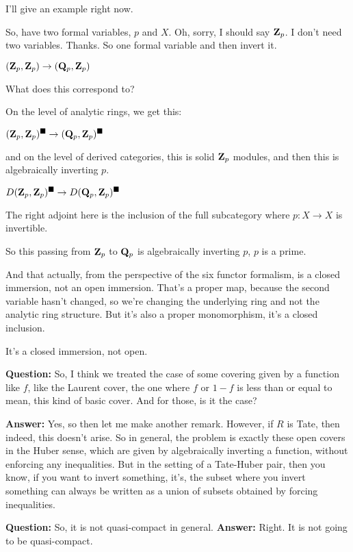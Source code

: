\begin{example}
I'll give an example right now.

So, have two formal variables, $p$ and $X$. Oh, sorry, I should say $\mathbf Z_p$. I don't need two variables. Thanks. So one formal variable and then invert it. 

$ (\mathbf Z_p, \mathbf Z_p) \to (\mathbf Q_p, \mathbf Z_p)$ \label{eq:z_p_to_q_p}

What does this correspond to? 

On the level of analytic rings, we get this:

$ (\mathbf Z_p, \mathbf Z_p)^\blacksquare \to (\mathbf Q_p, \mathbf Z_p)^\blacksquare$

and on the level of derived categories, this is solid $\mathbf Z_p$ modules, and then this is algebraically inverting $p$. 

$ D(\mathbf Z_p, \mathbf Z_p)^\blacksquare \to D(\mathbf Q_p, \mathbf Z_p)^\blacksquare $ 

The right adjoint here is the inclusion of the full subcategory where $p: X \to X$ is invertible.

So this passing from $\mathbf Z_p$ to $\mathbf Q_p$ is algebraically inverting $p$, $p$ is a prime. 


And that actually, from the perspective of the six functor formalism, is a closed immersion, not an open immersion. That's a proper map, because the second variable hasn't changed, so we're changing the underlying ring and not the analytic ring structure. But it's also a proper monomorphism, it's a closed inclusion. 

It's a closed immersion, not open.

\textbf{Question:} So, I think we treated the case of some covering given by a function like $f$, like the Laurent cover, the one where $f$ or $1-f$ is less than or equal to mean, this kind of basic cover. And for those, is it the case? 

\label{r_is_tate}
\textbf{Answer:} Yes, so then let me make another remark. However, if $R$ is Tate, then indeed, this doesn't arise. So in general, the problem is exactly these open covers in the Huber sense, which are given by algebraically inverting a function, without enforcing any inequalities. But in the setting of a Tate-Huber pair, then you know, if you want to invert something, it's, the subset where you invert something can always be written as a union of subsets obtained by forcing inequalities.

\textbf{Question:} So, it is not quasi-compact in general.
\textbf{Answer:} Right. It is not going to be quasi-compact.


\end{example}
